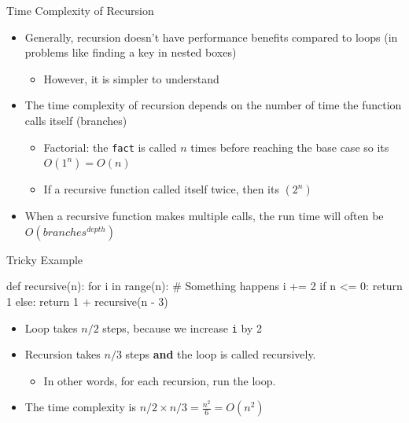 \documentclass[
  ignorenonframetext,
]{beamer}
\newenvironment{Shaded}{\begin{snugshade}}{\end{snugshade}}
\newcommand{\BuiltInTok}[1]{\textcolor[rgb]{0.00,0.23,0.31}{#1}}
\newcommand{\CommentTok}[1]{\textcolor[rgb]{0.37,0.37,0.37}{#1}}
\newcommand{\ControlFlowTok}[1]{\textcolor[rgb]{0.00,0.23,0.31}{#1}}
\newcommand{\DecValTok}[1]{\textcolor[rgb]{0.68,0.00,0.00}{#1}}
\newcommand{\KeywordTok}[1]{\textcolor[rgb]{0.00,0.23,0.31}{#1}}
\newcommand{\NormalTok}[1]{\textcolor[rgb]{0.00,0.23,0.31}{#1}}
\newcommand{\OperatorTok}[1]{\textcolor[rgb]{0.37,0.37,0.37}{#1}}
\providecommand{\tightlist}{%
  \setlength{\itemsep}{0pt}\setlength{\parskip}{0pt}}\usepackage{longtable,booktabs,array}
\begin{document}
\begin{frame}[fragile]{Time Complexity of Recursion}
\protect\hypertarget{time-complexity-of-recursion}{}
\begin{itemize}
\item
  Generally, recursion doesn't have performance benefits compared to
  loops (in problems like finding a key in nested boxes)

  \begin{itemize}
  \tightlist
  \item
    However, it is simpler to understand
  \end{itemize}
\item
  The time complexity of recursion depends on the number of time the
  function calls itself (branches)

  \begin{itemize}
  \item
    Factorial: the \texttt{fact} is called \(n\) times before reaching
    the base case so its \(O(1^n) = O(n)\)
  \item
    If a recursive function called itself twice, then its \((2^n)\)
  \end{itemize}
\item
  When a recursive function makes multiple calls, the run time will
  often be \(O(branches^{depth})\)
\end{itemize}
\end{frame}

\begin{frame}[fragile]{Tricky Example}
\protect\hypertarget{tricky-example}{}
\begin{Shaded}
\begin{Highlighting}[]
\KeywordTok{def}\NormalTok{ recursive(n):}
  \ControlFlowTok{for}\NormalTok{ i }\KeywordTok{in} \BuiltInTok{range}\NormalTok{(n):}
    \CommentTok{\# Something happens}
\NormalTok{    i }\OperatorTok{+=} \DecValTok{2}
  \ControlFlowTok{if}\NormalTok{ n }\OperatorTok{\textless{}=} \DecValTok{0}\NormalTok{:}
    \ControlFlowTok{return} \DecValTok{1}
  \ControlFlowTok{else}\NormalTok{:}
    \ControlFlowTok{return} \DecValTok{1} \OperatorTok{+}\NormalTok{ recursive(n }\OperatorTok{{-}} \DecValTok{3}\NormalTok{)}
\end{Highlighting}
\end{Shaded}

\begin{itemize}
\item
  Loop takes \(n/2\) steps, because we increase \texttt{i} by 2
\item
  Recursion takes \(n/3\) steps \textbf{and} the loop is called
  recursively.

  \begin{itemize}
  \tightlist
  \item
    In other words, for each recursion, run the loop.
  \end{itemize}
\item
  The time complexity is \(n/2 \times n/3 = \frac{n^2}{6} = O(n^2)\)
\end{itemize}
\end{frame}
\end{document}
